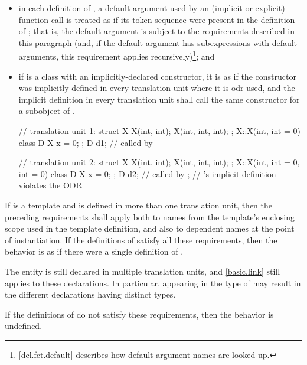 \begin{itemize}
\item in each definition of , a default argument used by an
(implicit or explicit) function call is treated as if its token sequence
were present in the definition of ; that is, the default
argument is subject to the requirements described in this paragraph (and, if
the default argument has subexpressions with default arguments, this
requirement applies recursively)\footnote{\ref{dcl.fct.default}
describes how default argument names are looked up.}; and

\item if  is a class with an implicitly-declared
constructor, it is as if the constructor was
implicitly defined in every translation unit where it is odr-used, and the
implicit definition in every translation unit shall call the same
constructor for a subobject of .
\begin{example}

\begin{codeblock}
// translation unit 1:
struct X {
  X(int, int);
  X(int, int, int);
};
X::X(int, int = 0) { }
class D {
  X x = 0;
};
D d1;                           //  called by 

// translation unit 2:
struct X {
  X(int, int);
  X(int, int, int);
};
X::X(int, int = 0, int = 0) { }
class D {
  X x = 0;
};
D d2;                           //  called by ;
                                // 's implicit definition violates the ODR
\end{codeblock}
\end{example}
\end{itemize}
If  is a template and is defined in more than one
translation unit, then the preceding requirements
shall apply both to names from the template's enclosing scope used in the
template definition, and also to dependent names at
the point of instantiation. If the definitions of
 satisfy all these requirements, then the behavior is
as if there were a single definition of .
\begin{note}
The entity is still declared in multiple translation units, and \ref{basic.link}
still applies to these declarations. In particular,
appearing in the type of  may result
in the different declarations having distinct types.
\end{note}
If the definitions of
 do not satisfy these requirements, then the behavior is
undefined.%

